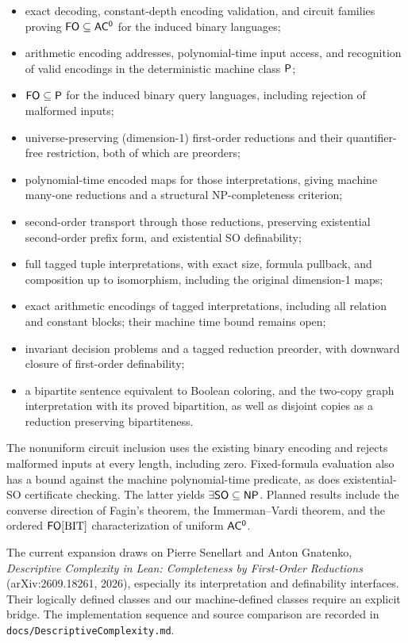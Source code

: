\begin{itemize}
    depth independent of the universe size for each fixed source formula;
  \item exact decoding, constant-depth encoding validation, and circuit families
    proving $\mathsf{FO} \subseteq \mathsf{AC^0}$ for the induced binary languages;
  \item arithmetic encoding addresses, polynomial-time input access, and
    recognition of valid encodings in the deterministic machine class $\mathsf{P}$;
  \item $\mathsf{FO}\subseteq\mathsf{P}$ for the induced binary query languages,
    including rejection of malformed inputs;
  \item universe-preserving (dimension-1) first-order reductions and their
    quantifier-free restriction, both of which are preorders;
  \item polynomial-time encoded maps for those interpretations, giving machine
    many-one reductions and a structural NP-completeness criterion;
  \item second-order transport through those reductions, preserving existential
    second-order prefix form, and existential SO definability;
  \item full tagged tuple interpretations, with exact size, formula pullback,
    and composition up to isomorphism, including the original dimension-1 maps;
  \item exact arithmetic encodings of tagged interpretations, including all
    relation and constant blocks; their machine time bound remains open;
  \item invariant decision problems and a tagged reduction preorder, with
    downward closure of first-order definability;
  \item a bipartite sentence equivalent to Boolean coloring, and the two-copy
    graph interpretation with its proved bipartition, as well as disjoint copies
    as a reduction preserving bipartiteness.
\end{itemize}
The nonuniform circuit inclusion uses the existing binary encoding and rejects
malformed inputs at every length, including zero. Fixed-formula evaluation also
has a bound against the machine polynomial-time predicate, as does existential-SO
certificate checking. The latter yields $\exists\mathsf{SO}\subseteq\mathsf{NP}$.
Planned results include the converse direction of Fagin's theorem, the
Immerman--Vardi theorem, and the ordered
$\mathsf{FO}[\mathrm{BIT}]$ characterization of uniform $\mathsf{AC^0}$.

The current expansion draws on Pierre Senellart and Anton Gnatenko,
\emph{Descriptive Complexity in Lean: Completeness by First-Order Reductions}
(arXiv:2609.18261, 2026), especially its interpretation and definability
interfaces. Their logically defined classes and our machine-defined classes
require an explicit bridge. The implementation sequence and source comparison
are recorded in \texttt{docs/DescriptiveComplexity.md}.


